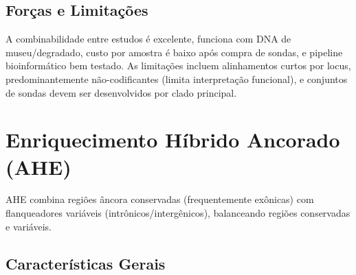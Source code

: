 \subsection{Forças e Limitações}

A combinabilidade entre estudos é excelente, funciona com DNA de museu/degradado, custo por amostra é baixo após compra de sondas, e pipeline bioinformático bem testado. As limitações incluem alinhamentos curtos por locus, predominantemente não-codificantes (limita interpretação funcional), e conjuntos de sondas devem ser desenvolvidos por clado principal.

\textcite{faircloth2012, mccormack2013, zhang2019, branstetter2017}

\section{Enriquecimento Híbrido Ancorado (AHE)}

AHE combina regiões âncora conservadas (frequentemente exônicas) com flanqueadores variáveis (intrônicos/intergênicos), balanceando regiões conservadas e variáveis.

\subsection{Características Gerais}

